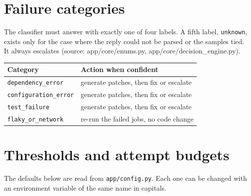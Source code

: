 \documentclass[11pt,a4paper]{report}
\begin{document}
\section{Failure categories}

The classifier must answer with exactly one of four labels. A fifth label, \texttt{unknown}, exists only for the case where the reply could not be parsed or the samples tied. It always escalates (source: app/core/enums.py, app/core/decision\_engine.py).

\begin{longtable}{>{\raggedright\arraybackslash}p{0.356\dimexpr\linewidth-4\tabcolsep\relax}>{\raggedright\arraybackslash}p{0.644\dimexpr\linewidth-4\tabcolsep\relax}}
\toprule
\textbf{Category} & \textbf{Action when confident} \\
\midrule
\endhead
\texttt{dependency\_\allowbreak{}error} & generate patches, then fix or escalate \\
\texttt{configuration\_\allowbreak{}error} & generate patches, then fix or escalate \\
\texttt{test\_\allowbreak{}failure} & generate patches, then fix or escalate \\
\texttt{flaky\_\allowbreak{}or\_\allowbreak{}network} & re-run the failed jobs, no code change \\
\bottomrule
\end{longtable}

\section{Thresholds and attempt budgets}

The defaults below are read from \texttt{app/\allowbreak{}config.\allowbreak{}py}. Each one can be changed with an environment variable of the same name in capitals.
\end{document}
